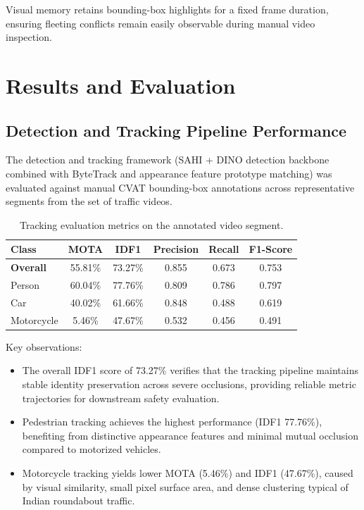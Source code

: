 \documentclass[12pt,a4paper]{report}
\begin{document}
Visual memory retains bounding-box highlights for a fixed frame duration, ensuring fleeting conflicts remain easily observable during manual video inspection.
\clearpage\thispagestyle{empty}\newpage

\chapter{Results and Evaluation}
\label{chap:results}

\section{Detection and Tracking Pipeline Performance}

The detection and tracking framework (SAHI + DINO detection backbone combined with ByteTrack and appearance feature prototype matching) was evaluated against manual CVAT bounding-box annotations across representative segments from the set of traffic videos.

\begin{table}[H]
\centering
\caption{Tracking evaluation metrics on the annotated video segment.}
\label{tab:tracking_metrics}
\begin{tabular}{lccccc}
\toprule
\textbf{Class} & \textbf{MOTA} & \textbf{IDF1} & \textbf{Precision} & \textbf{Recall} & \textbf{F1-Score} \\
\midrule
\textbf{Overall} & 55.81\% & 73.27\% & 0.855 & 0.673 & 0.753 \\
Person           & 60.04\% & 77.76\% & 0.809 & 0.786 & 0.797 \\
Car              & 40.02\% & 61.66\% & 0.848 & 0.488 & 0.619 \\
Motorcycle       &  5.46\% & 47.67\% & 0.532 & 0.456 & 0.491 \\
\bottomrule
\end{tabular}
\end{table}

Key observations:
\begin{itemize}
    \item The overall IDF1 score of 73.27\% verifies that the tracking pipeline maintains stable identity preservation across severe occlusions, providing reliable metric trajectories for downstream safety evaluation.
    \item Pedestrian tracking achieves the highest performance (IDF1 77.76\%), benefiting from distinctive appearance features and minimal mutual occlusion compared to motorized vehicles.
    \item Motorcycle tracking yields lower MOTA (5.46\%) and IDF1 (47.67\%), caused by visual similarity, small pixel surface area, and dense clustering typical of Indian roundabout traffic.
\end{itemize}
\end{document}
